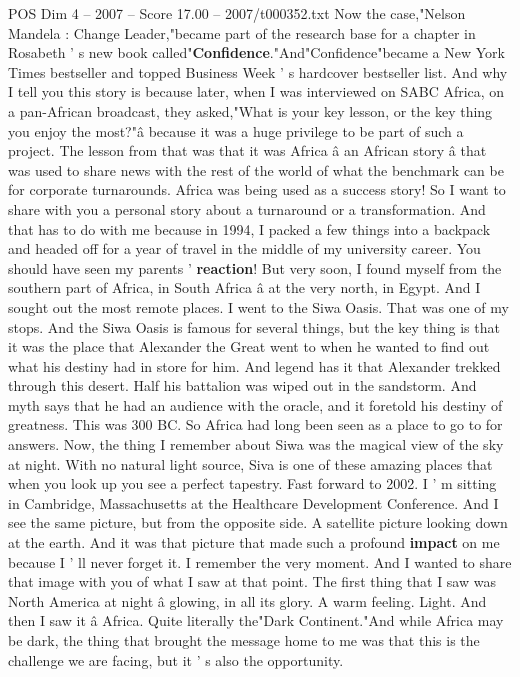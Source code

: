 \begin{textsample}{POS Dim 4 – 2007 – Score 17.00 – 2007/t000352.txt}
Now the case,"Nelson Mandela : Change Leader,"became part of the research base for a chapter in Rosabeth ' s new book called"\textbf{Confidence}."And"Confidence"became a New York Times bestseller and topped Business Week ' s hardcover bestseller list.
And why I tell you this story is because later, when I was interviewed on SABC Africa, on a pan-African broadcast, they asked,"What is your key lesson, or the key thing you enjoy the most?"â because it was a huge privilege to be part of such a project.
The lesson from that was that it was Africa â an African story â that was used to share news with the rest of the world of what the benchmark can be for corporate turnarounds.
Africa was being used as a success story!
So I want to share with you a personal story about a turnaround or a transformation.
And that has to do with me because in 1994, I packed a few things into a backpack and headed off for a year of travel in the middle of my university career.
You should have seen my parents ' \textbf{reaction}!
But very soon, I found myself from the southern part of Africa, in South Africa â at the very north, in Egypt.
And I sought out the most remote places.
I went to the Siwa Oasis.
That was one of my stops.
And the Siwa Oasis is famous for several things, but the key thing is that it was the place that Alexander the Great went to when he wanted to find out what his destiny had in store for him.
And legend has it that Alexander trekked through this desert.
Half his battalion was wiped out in the sandstorm.
And myth says that he had an audience with the oracle, and it foretold his destiny of greatness.
This was 300 BC.
So Africa had long been seen as a place to go to for answers.
Now, the thing I remember about Siwa was the magical view of the sky at night.
With no natural light source, Siva is one of these amazing places that when you look up you see a perfect tapestry.
Fast forward to 2002.
I ' m sitting in Cambridge, Massachusetts at the Healthcare Development Conference.
And I see the same picture, but from the opposite side.
A satellite picture looking down at the earth.
And it was that picture that made such a profound \textbf{impact} on me because I ' ll never forget it.
I remember the very moment.
And I wanted to share that image with you of what I saw at that point.
The first thing that I saw was North America at night â glowing, in all its glory.
A warm feeling.
Light.
And then I saw it â Africa.
Quite literally the"Dark Continent."And while Africa may be dark, the thing that brought the message home to me was that this is the challenge we are facing, but it ' s also the opportunity.

\end{textsample}
